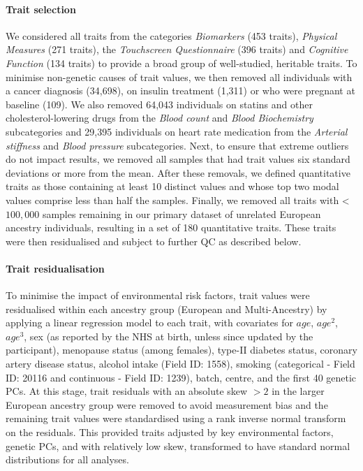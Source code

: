 \documentclass[12pt]{zHenriquesLab-StyleBioRxiv}
\begin{document}
{{\paragraph*{Trait selection} 
We considered all traits from the categories \textit{Biomarkers} (453 traits), 
\textit{Physical Measures} (271 traits), the \textit{Touchscreen Questionnaire} (396 traits) 
and \textit{Cognitive Function} (134 traits) to provide a broad group of well-studied, heritable traits. 
To minimise non-genetic causes of trait values, we then removed all individuals with a cancer diagnosis (34,698), 
on insulin treatment (1,311) or who were pregnant at baseline (109). We also removed 64,043 individuals 
on statins and other cholesterol-lowering drugs from the \textit{Blood count} 
and \textit{Blood Biochemistry} subcategories and 29,395 individuals
on heart rate medication from the \textit{Arterial stiffness} and \textit{Blood pressure} subcategories.
Next, to ensure that extreme outliers do not impact results, we removed all samples that had 
trait values six standard deviations or more from the mean. After these removals, we defined quantitative traits as 
those containing at least 10 distinct values and whose top two modal values comprise less than 
half the samples. Finally, we removed all traits with < $100,000$ samples remaining in our 
primary dataset of unrelated European ancestry individuals, resulting in a set of 180 quantitative 
traits. These traits were then residualised and subject to further QC as described below. 
%
\paragraph*{Trait residualisation}
To minimise the impact of environmental risk factors, trait values were 
residualised within each ancestry group (European and Multi-Ancestry) by applying a linear regression 
model to each trait, with covariates for $age$, $age^2$, $age^3$, sex (as reported by the NHS at birth, unless 
since updated by the participant), menopause status (among females), %
type-II diabetes status, coronary artery disease status, alcohol intake (Field ID: 1558), 
smoking (categorical - Field ID: 20116 and continuous - Field ID: 1239), 
batch, centre, and the first 40 genetic PCs.  
At this stage, trait residuals with an absolute skew $>2$ \cite{skew_book} 
in the larger European ancestry group were removed to avoid measurement bias and 
the remaining trait values were standardised using a rank inverse 
normal transform on the residuals. This provided traits adjusted by key environmental factors, genetic 
PCs, and with relatively low skew, transformed to have standard normal distributions for all analyses. 
%
}}
\end{document}
